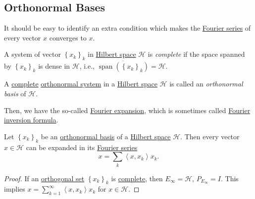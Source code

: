 \subsection{Orthonormal Bases}
It should be easy to identify an extra condition which makes the \hyperref[def:Fourier-series]{Fourier series} of every vector \(x\) converges to \(x\).

\begin{definition}\label{def:complete-system}
	A system of vector \(\left\{ x_k\right\}_k\) in \hyperref[def:Hilbert-space]{Hilbert space} \(\mathcal{H} \) is \emph{complete} if the space spanned by \(\left\{ x_k\right\}_k\) is dense in \(\mathcal{H} \), i.e., \(\overline{\operatorname{span}(\left\{ x_k \right\} _k)} = \mathcal{H} \).
\end{definition}

\begin{definition}\label{def:orthonormal-basis}
	A \hyperref[def:complete-system]{complete} \hyperref[def:orthonormal-system]{orthonormal system} in a \hyperref[def:Hilbert-space]{Hilbert space} \(\mathcal{H} \) is called an \emph{orthonormal basis} of \(\mathcal{H} \).
\end{definition}

Then, we have the so-called \hyperref[thm:Fourier-expansion]{Fourier expansion}, which is sometimes called \href{https://en.wikipedia.org/wiki/Fourier_inversion_theorem}{Fourier inversion formula}.

\begin{theorem}\label{thm:Fourier-expansion}
	Let \(\left\{ x_k \right\} _k\) be an \hyperref[def:orthonormal-basis]{orthonormal basis} of a \hyperref[def:Hilbert-space]{Hilbert space} \(\mathcal{H} \). Then every vector \(x\in \mathcal{H} \) can be expanded in its \hyperref[def:Fourier-series]{Fourier series}
	\[
		x = \sum_{k} \left\langle x, x_k \right\rangle x_k.
	\]
\end{theorem}
\begin{proof}
	If an \hyperref[def:orthogonal-system]{orthogonal set} \(\left\{ x_{k} \right\}_k \) is \hyperref[def:complete-system]{complete}, then \(E_\infty = \mathcal{H} \), \(P_{E_\infty } = I\). This implies \(x = \sum_{k=1}^{\infty} \left\langle x, x_{k}  \right\rangle x_{k}\) for \(x\in \mathcal{H} \).
\end{proof}

